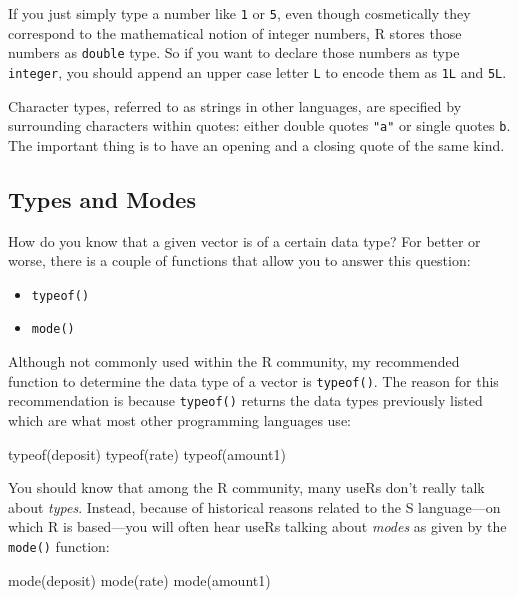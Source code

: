 \documentclass[
]{book}
\newenvironment{Shaded}{\begin{snugshade}}{\end{snugshade}}
\newcommand{\FunctionTok}[1]{\textcolor[rgb]{0.00,0.00,0.00}{#1}}
\newcommand{\NormalTok}[1]{#1}
\begin{document}
If you just simply type a number like \texttt{1} or \texttt{5}, even though cosmetically
they correspond to the mathematical notion of integer numbers, R stores those
numbers as \texttt{double} type. So if you want to declare those numbers as type
\texttt{integer}, you should append an upper case letter \texttt{L} to encode them as \texttt{1L}
and \texttt{5L}.

Character types, referred to as strings in other languages, are specified by
surrounding characters within quotes: either double quotes \texttt{"a"} or single
quotes \texttt{\textquotesingle{}b\textquotesingle{}}. The important thing is to have an opening and a closing quote
of the same kind.

\hypertarget{types-and-modes}{%
\subsection{Types and Modes}\label{types-and-modes}}

How do you know that a given vector is of a certain data type? For better or
worse, there is a couple of functions that allow you to answer this question:

\begin{itemize}
\item
  \texttt{typeof()}
\item
  \texttt{mode()}
\end{itemize}

Although not commonly used within the R community, my recommended function
to determine the data type of a vector is \texttt{typeof()}. The reason for this
recommendation is because \texttt{typeof()} returns the data types previously listed
which are what most other programming languages use:

\begin{Shaded}
\begin{Highlighting}[]
\FunctionTok{typeof}\NormalTok{(deposit)}
\FunctionTok{typeof}\NormalTok{(rate)}
\FunctionTok{typeof}\NormalTok{(amount1)}
\end{Highlighting}
\end{Shaded}

You should know that among the R community, many useRs don't really talk about
\emph{types}. Instead, because of historical reasons related to the S language---on
which R is based---you will often hear useRs talking about \emph{modes} as given by
the \texttt{mode()} function:

\begin{Shaded}
\begin{Highlighting}[]
\FunctionTok{mode}\NormalTok{(deposit)}
\FunctionTok{mode}\NormalTok{(rate)}
\FunctionTok{mode}\NormalTok{(amount1)}
\end{Highlighting}
\end{Shaded}
\end{document}
